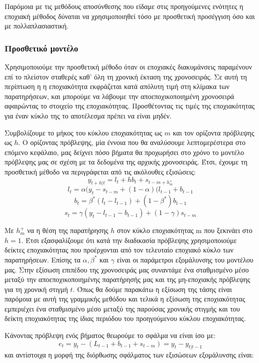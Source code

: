 Παρόμοια με τις μεθόδους αποσύνθεσης που είδαμε στις προηγούμενες ενότητες η εποχιακή μέθοδος  δύναται να χρησιμοποιηθεί τόσο με προσθετική προσέγγιση όσο και με πολλαπλασιαστική. 

\subsubsection{Προσθετικό μοντέλο }

Χρησιμοποιούμε την προσθετική μέθοδο όταν οι εποχιακές διακυμάνσεις παραμένουν επί το πλείστον σταθερές καθ' όλη τη χρονική έκταση της χρονοσειράς. Σε αυτή τη περίπτωση η η εποχιακότητα εκφράζεται κατά απόλυτη τιμή στη κλίμακα των παρατηρήσεων, και μπορούμε να λάβουμε την αποεποχικοποιημένη  χρονοσειρά αφαιρώντας το στοιχείο της εποχιακότητας.
Προσθέτοντας τις τιμές της εποχιακότητας για έναν κύκλο της το αποτέλεσμα πρέπει να είναι μηδέν.

Συμβολίζουμε το μήκος του κύκλου εποχιακότητας ως $m$ και τον ορίζοντα πρόβλεψης ως $h$. Ο ορίζοντας πρόβλεψης, μία έννοια που θα αναλύσουμε λεπτομερέστερα στο επόμενο κεφάλαιο, μας δείχνει πόσο βήματα θα προχωρήσει στο χρόνο το μοντέλο πρόβλεψης μας σε σχέση με τα δεδομένα της αρχικής χρονοσειράς. Έτσι, έχουμε τη προσθετική μέθοδο  να περιγράφεται από τις ακόλουθες εξισώσεις:
\[ y_{t+h|t} = l_t + hb_t + s_{t-m+h^+_m}\]
\[l_t = \alpha(y_t - s_{t-m} + (1 - \alpha)(l_{t-1} + b_{t-1}\]
\[b_t = \beta^*(l_t - l_{t-1}) + (1-\beta^*)b_{t-1}\]
\[s_t = \gamma(y_t - l_{t-1} - b_{t-1}) + (1-\gamma)s_{t-m}\]

Με $h^+_m$ να η θέση της παρατήρησης $h$ στον κύκλο εποχιακότητας m που ξεκινάει στο $h=1$. 
Έτσι εξασφαλίζουμε ότι κατά την διαδικασία πρόβλεψης χρησιμοποιούμε δείκτες εποχιακότητας που προέρχονται από τον τελευταίο εποχιακό κύκλο των παρατηρήσεων. Επίσης τα $\alpha, \beta^*$ και $ \gamma$ είναι οι παράμετροι εξομάλυνσης του μοντέλου μας. 
Στην εξίσωση επιπέδου της χρονοσειράς μας συναντάμε ένα σταθμισμένο μέσο μεταξύ την αποεποχικοποιημένης παρατήρησής μας και της μη-εποχιακής πρόβλεψης για τη χρονική στιγμή $t$. Όπως θα δούμε παρακάτω η εξίσωση της τάσης είναι παρόμοια με αυτή της γραμμικής μεθόδου  και τελικά η εξίσωση της εποχιακότητας εμπεριέχει ένα σταθμισμένο μέσο μεταξύ της παρούσας χρονικής στιγμής και του δείκτη εποχιακότητας της ίδιας περιόδου του προηγούμενου κύκλου εποχιακότητας. 

Κάνοντας πρόβλεψη ενός βήματος θεωρούμε το σφάλμα να είναι ίσο με:
\[e_t = y_t - (L_{t-1} + b_{t-1} + s_{t-m}) = y_t - y_{t|t-1} \]
και αντίστοιχα η μορφή της διόρθωσης σφάλματος των εξισώσεων εξομάλυνσης είναι:

